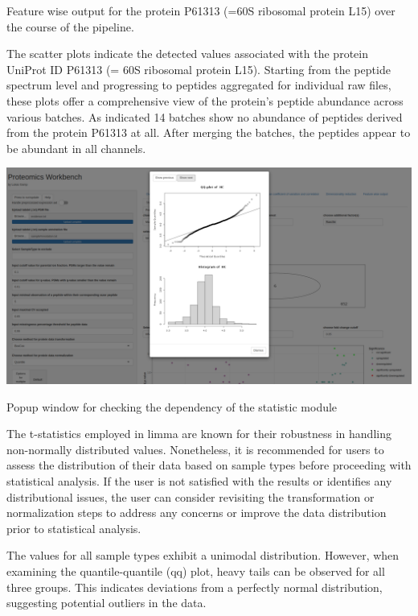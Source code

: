 \documentclass[
  11pt,
]{article}
\let\origfigure\figure
\begin{document}
\caption{Feature wise output for the protein P61313 (=60S ribosomal protein L15) over the course of the pipeline.}\label{fig:ui_feature}
 \endfigure\egroup

The scatter plots indicate the detected values associated with the
protein UniProt ID P61313 (= 60S ribosomal protein L15). Starting from
the peptide spectrum level and progressing to peptides aggregated for
individual raw files, these plots offer a comprehensive view of the
protein's peptide abundance across various batches. As indicated 14
batches show no abundance of peptides derived from the protein P61313 at
all. After merging the batches, the peptides appear to be abundant in
all channels.

\newpage
\bgroup  \origfigure[H] 

{\centering \includegraphics[width=1\linewidth]{screenshots/stat_dependency} 

}

\caption{Popup window for checking the dependency of the statistic module}\label{fig:ui_stat_dependency}
 \endfigure\egroup

The t-statistics employed in limma are known for their robustness in
handling non-normally distributed values. Nonetheless, it is recommended
for users to assess the distribution of their data based on sample types
before proceeding with statistical analysis. If the user is not
satisfied with the results or identifies any distributional issues, the
user can consider revisiting the transformation or normalization steps
to address any concerns or improve the data distribution prior to
statistical analysis.

The values for all sample types exhibit a unimodal distribution.
However, when examining the quantile-quantile (qq) plot, heavy tails can
be observed for all three groups. This indicates deviations from a
perfectly normal distribution, suggesting potential outliers in the
data.
\end{document}
